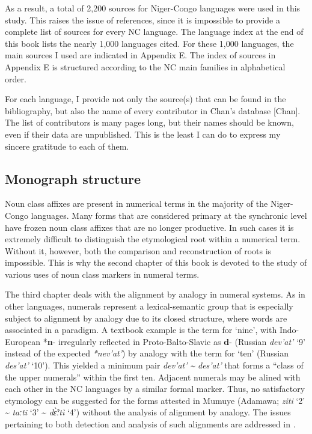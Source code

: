 As a result, a total of 2,200 sources for Niger-Congo languages were used in this study. This raises the issue of references, since it is impossible to provide a complete list of sources for every NC language. The language index at the end of this book lists the nearly 1,000 languages cited. For these 1,000 languages, the main sources I used are indicated in Appendix E. The index of sources in Appendix E is structured according to the NC main families in alphabetical order. 

For each language, I provide not only the source(s) that can be found in the bibliography, but also the name of every contributor in Chan’s database [Chan]. The list of contributors is many pages long, but their names should be known, even if their data are unpublished. This is the least I can do to express my sincere gratitude to each of them.

\subsection{Monograph structure}
Noun class affixes are present in numerical terms in the majority of the Niger-Congo languages. Many forms that are considered primary at the synchronic level have frozen noun class affixes that are no longer productive. In such cases it is extremely difficult to distinguish the etymological root within a numerical term. Without it, however, both the comparison and reconstruction of roots is impossible. This is why the second chapter of this book is devoted to the study of various uses of noun class markers in numeral terms.

The third chapter  deals with the alignment by analogy in numeral systems. As in other languages, numerals represent a lexical-semantic group that is especially subject to alignment by analogy due to its closed structure, where words are associated in a paradigm. A textbook example is the term for ‘nine’, with Indo-European *\textbf{n}{}- irregularly reflected in Proto-Balto-Slavic as \textbf{d}{}- (Russian \textit{dev’at’} ‘9’ instead of the expected \textit{*nev’at’}) by analogy with the term for ‘ten’ (Russian \textit{des’at’} ‘10’). This yielded a minimum pair \textit{dev’at’} \textit{{\textasciitilde} des’at’} that forms a “class of the upper numerals” within the first ten. Adjacent numerals may be alined with each other in the NC languages by a similar formal marker. Thus, no satisfactory etymology can be suggested for the forms attested in Mumuye (Adamawa; \textit{ziti} ‘2’ {\textasciitilde} \textit{taːti} ‘3’ {\textasciitilde} \textit{d{\~{\`ɛ}}ːt{\`{i}}} ‘4’) without the analysis of alignment by analogy. The issues pertaining to both detection and analysis of such alignments are addressed in .

